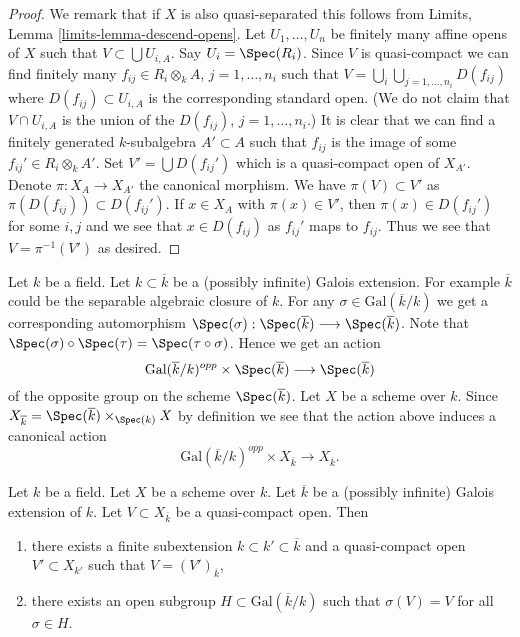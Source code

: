 \begin{proof}
We remark that if $X$ is also quasi-separated this follows from
Limits, Lemma \ref{limits-lemma-descend-opens}. Let
$U_1, \ldots, U_n$ be finitely many affine opens of $X$
such that $V \subset \bigcup U_{i, A}$. Say $U_i = \Spec(R_i)$.
Since $V$ is quasi-compact we can find finitely many
$f_{ij} \in R_i \otimes_k A$, $j = 1, \ldots, n_i$
such that $V = \bigcup_i \bigcup_{j = 1, \ldots, n_i} D(f_{ij})$
where $D(f_{ij}) \subset U_{i, A}$ is the corresponding standard
open. (We do not claim that $V \cap U_{i, A}$ is the union
of the $D(f_{ij})$, $j = 1, \ldots, n_i$.)
It is clear that we can find a finitely generated $k$-subalgebra
$A' \subset A$ such that $f_{ij}$ is the image of some
$f_{ij}' \in R_i \otimes_k A'$.
Set $V' = \bigcup D(f_{ij}')$ which is a quasi-compact open of $X_{A'}$.
Denote $\pi : X_A \to X_{A'}$ the canonical morphism.
We have $\pi(V) \subset V'$ as $\pi(D(f_{ij})) \subset D(f_{ij}')$.
If $x \in X_A$ with $\pi(x) \in V'$, then $\pi(x) \in D(f_{ij}')$
for some $i, j$ and we see that $x \in D(f_{ij})$ as $f_{ij}'$
maps to $f_{ij}$. Thus we see that $V = \pi^{-1}(V')$ as desired.
\end{proof}

\noindent
Let $k$ be a field. Let $k \subset \overline{k}$ be a (possibly infinite)
Galois extension. For example $\overline{k}$ could be the
separable algebraic closure of $k$.
For any $\sigma \in \text{Gal}(\overline{k}/k)$ we get a corresponding
automorphism
$
\Spec(\sigma) :
\Spec(\overline{k})
\longrightarrow
\Spec(\overline{k})
$.
Note that
$\Spec(\sigma) \circ \Spec(\tau) = \Spec(\tau \circ \sigma)$.
Hence we get an action
$$
\text{Gal}(\overline{k}/k)^{opp} \times \Spec(\overline{k})
\longrightarrow
\Spec(\overline{k})
$$
of the opposite group on the scheme $\Spec(\overline{k})$.
Let $X$ be a scheme over $k$. Since
$X_{\overline{k}} =
\Spec(\overline{k}) \times_{\Spec(k)} X$
by definition we see that the action above induces a canonical action
\begin{equation}
\label{equation-galois-action-base-change-kbar}
\text{Gal}(\overline{k}/k)^{opp} \times X_{\overline{k}}
\longrightarrow
X_{\overline{k}}.
\end{equation}

\begin{lemma}
\label{lemma-Galois-action-quasi-compact-open}
Let $k$ be a field. Let $X$ be a scheme over $k$.
Let $\overline{k}$ be a (possibly infinite) Galois extension of $k$.
Let $V \subset X_{\overline{k}}$ be a quasi-compact open.
Then
\begin{enumerate}
\item there exists a finite subextension $k \subset k' \subset \overline{k}$
and a quasi-compact open $V' \subset X_{k'}$ such that
$V = (V')_{\overline{k}}$,
\item there exists an open subgroup $H \subset \text{Gal}(\overline{k}/k)$
such that $\sigma(V) = V$ for all $\sigma \in H$.
\end{enumerate}
\end{lemma}

